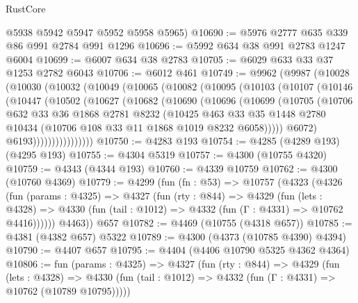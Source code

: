 \begin{lexlean}{RustCore}
\begin{coremodule}
      @5938
      @5942
      @5947
      @5952
      @5958
      @5965)
@10690 := @5976 @2777 @635 @339 @86 @991 @2784 @991 @1296
@10696 := @5992 @634 @38 @991 @2783 @1247 @6004
@10699 := @6007 @634 @38 @2783
@10705 := @6029 @633 @33 @37 @1253 @2782 @6043
@10706 := @6012 @461
@10749 := @9962
    (@9987
      (@10028
        (@10030
          (@10032
            (@10049
              (@10065
                (@10082
                  (@10095
                    (@10103
                      (@10107
                        (@10146
                          (@10447
                            (@10502
                              (@10627
                                (@10682
                                  (@10690
                                    (@10696
                                      (@10699
                                        (@10705
                                          (@10706
                                            @632
                                            @33
                                            @36
                                            @1868
                                            @2781
                                            @8232
                                            (@10425
                                              @463
                                              @33
                                              @35
                                              @1448
                                              @2780
                                              @10434
                                              (@10706 @108 @33 @11 @1868 @1019 @8232 @6058)))))
                                      @6072)
                                    @6193))))))))))))))))
@10750 := @4283 @193
@10754 := @4285 (@4289 @193) (@4295 @193)
@10755 := @4304 @5319
@10757 := @4300 (@10755 @4320)
@10759 := @4343 (@4344 @193)
@10760 := @4339 @10759
@10762 := @4300 (@10760 @4369)
@10779 := @4299
    (fun (fn : @53) =>
    @10757
      (@4323
        (@4326
          (fun (params : @4325) =>
          @4327
            (fun (rty : @844) =>
            @4329
              (fun (lets : @4328) =>
              @4330 (fun (tail : @1012) => @4332 (fun (Γ : @4331) => @10762 @4416))))))
        @4463))
    @657
@10782 := @4469 (@10755 (@4318 @657))
@10785 := @4381 (@4382 @657) @5322
@10789 := @4300 (@4373 (@10785 @4390) @4394)
@10790 := @4407 @657
@10795 := @4404 (@4406 @10790 @5325 @4362 @4364)
@10806 := fun (params : @4325) =>
  @4327
    (fun (rty : @844) =>
    @4329
      (fun (lets : @4328) =>
      @4330 (fun (tail : @1012) => @4332 (fun (Γ : @4331) => @10762 (@10789 @10795)))))

\end{coremodule}
\end{lexlean}
